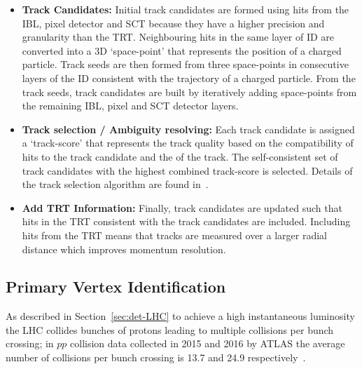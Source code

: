 \begin{itemize}[leftmargin=*]
\item\textbf{Track Candidates:}
  Initial track candidates are formed using hits from the IBL, pixel detector and SCT because they have a higher precision and granularity than the TRT.
  Neighbouring hits in the same layer of ID are converted into a 3D `space-point' that represents the position of a charged particle.
  Track seeds are then formed from three space-points in consecutive layers of the ID
  consistent with the trajectory of a charged particle. %
  From the track seeds, track candidates are built by iteratively adding space-points
  from the remaining IBL, pixel and SCT detector layers.
  \\\vspace{0.5em}
\item\textbf{Track selection / Ambiguity resolving:}
  Each track candidate is assigned a `track-score' that represents the track quality based on
  the compatibility of hits to the track candidate and the \pT{} of the track.
  The self-consistent set of track candidates with the highest combined track-score is selected.
  Details of the track selection algorithm are found in~\cite{obj-tracks_TIDE}.\vspace{0.5em}
\item\textbf{Add TRT Information:}
  Finally, track candidates are updated such that hits in the TRT consistent with the track candidates are included.
  Including hits from the TRT means that tracks are measured over a larger radial distance which improves momentum resolution.
\end{itemize}

\subsection{Primary Vertex Identification}
\label{sec:obj-tracks_pv}

As described in Section~\ref{sec:det-LHC} to achieve a high instantaneous luminosity the LHC collides bunches of protons leading to multiple collisions per bunch crossing;
in $pp$ collision data collected in 2015 and 2016 by ATLAS the average number of collisions per bunch crossing is 13.7 and 24.9 respectively~\cite{det-ATLAS_lumi_twiki}.

